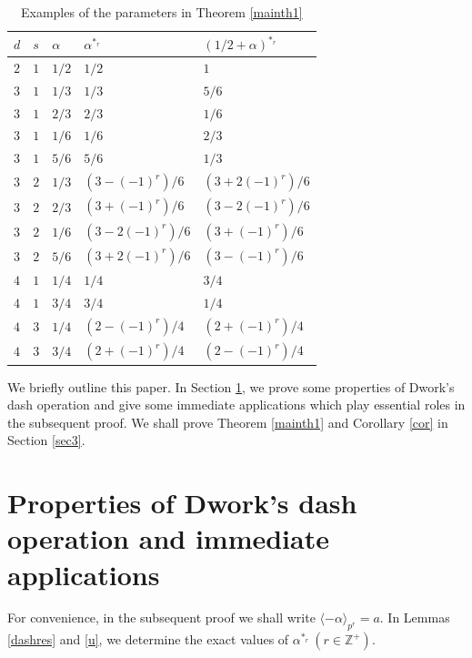 \documentclass[12pt,reqno]{amsart}
\def\Z{\mathbb Z}
\def\<{\langle}
\def\>{\rangle}
\theoremstyle{plain}
\theoremstyle{definition}
\theoremstyle{remark}
\numberwithin{equation}{section}
\begin{document}
\begin{table}[htbp]
    \centering
    \caption{Examples of the parameters in Theorem \ref{mainth1}}
    \label{examples}
    \renewcommand{\arraystretch}{1.5}
    \begin{tabular}{>{\centering\arraybackslash}p{2cm}
                      >{\centering\arraybackslash}p{2cm}
                      >{\centering\arraybackslash}p{2cm}
                      >{\centering\arraybackslash}p{3cm}
                      >{\centering\arraybackslash}p{3cm}}
        \toprule 
        $d$ & $s$ & $\alpha$ & $\alpha^{\ast_r}$ & $(1/2+\alpha)^{\ast_r}$\\
        \midrule 
        $2$ & $1$ & $1/2$  & $1/2$ & $1$\\
        $3$ & $1$ & $1/3$  & $1/3$ & $5/6$\\
        $3$ & $1$ & $2/3$  & $2/3$ & $1/6$\\
        $3$ & $1$ & $1/6$  & $1/6$ & $2/3$\\
        $3$ & $1$ & $5/6$  & $5/6$ & $1/3$\\
        $3$ & $2$ & $1/3$  & $(3-(-1)^r)/6$ & $(3+2(-1)^r)/6$\\
        $3$ & $2$ & $2/3$  & $(3+(-1)^r)/6$ & $(3-2(-1)^r)/6$\\
        $3$ & $2$ & $1/6$  & $(3-2(-1)^r)/6$ & $(3+(-1)^r)/6$\\
        $3$ & $2$ & $5/6$  & $(3+2(-1)^r)/6$ & $(3-(-1)^r)/6$\\
        $4$ & $1$ & $1/4$ & $1/4$ & $3/4$\\
        $4$ & $1$ & $3/4$ & $3/4$ & $1/4$\\
        $4$ & $3$ & $1/4$ & $(2-(-1)^r)/4$ & $(2+(-1)^r)/4$\\
        $4$ & $3$ & $3/4$ & $(2+(-1)^r)/4$ & $(2-(-1)^r)/4$\\
        \bottomrule
    \end{tabular}
\end{table}

We briefly outline this paper. In Section \ref{sec2}, we prove some properties of Dwork's dash operation and give some immediate applications which play essential roles in the subsequent proof. We shall prove Theorem \ref{mainth1} and Corollary \ref{cor} in Section \ref{sec3}.

\section{Properties of Dwork's dash operation and immediate applications}\label{sec2}
For convenience, in the subsequent proof we shall write $\<-\alpha\>_{p^r}=a$. In Lemmas \ref{dashres} and \ref{u}, we determine the exact values of $\alpha^{\ast_r}\ (r\in\Z^+)$. 
\end{document}
